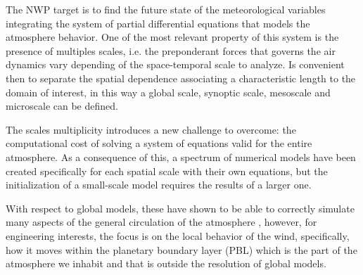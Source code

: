 The NWP target is to find the future state of the meteorological variables integrating the system of partial differential equations that models the atmosphere behavior. One of the most relevant property of this system is the presence of multiples scales, i.e. the preponderant forces that governs the air dynamics vary depending of the space-temporal scale to analyze. Is convenient then to separate the spatial dependence associating a characteristic length to the domain of interest, in this way a global scale, synoptic scale, mesoscale and microscale can be defined.

The scales multiplicity introduces a new challenge to overcome: the computational cost of solving a system of equations valid for the entire atmosphere. As a consequence of this, a spectrum of numerical models have been created specifically for each spatial scale with their own equations, but the initialization of a small-scale model requires the results of a larger one.

With respect to global models, these have shown to be able to correctly simulate many aspects of the general circulation of the atmosphere \citep{stocker2013climate}, however, for engineering interests, the focus is on the local behavior of the wind, specifically, how it moves within the planetary boundary layer (PBL) which is the part of the atmosphere we inhabit and that is outside the resolution of global models.

